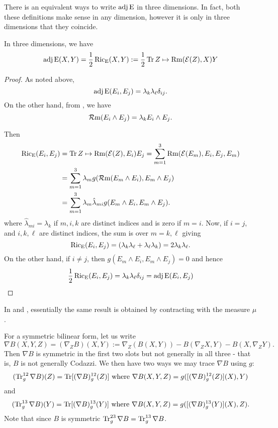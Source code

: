 \documentclass[a4paper, 12pt]{amsart}
\begin{document}
There is an equivalent ways to write \(\operatorname{adj}\operatorname{E}\) in three dimensions. In fact, both these definitions make sense in any dimension, however it is only in three dimensions that they coincide.

\begin{lemma}
\label{eq:xcf_equiv}
In three dimensions, we have
\[
\operatorname{adj}\operatorname{E}(X, Y) = \frac{1}{2} \operatorname{Ric}_{\operatorname{E}} (X, Y) := \frac{1}{2} \operatorname{Tr} Z \mapsto \operatorname{Rm}(\operatorname{\mathcal{E}}(Z), X) Y
\]
\end{lemma}

\begin{proof}
As noted above,
\[
\operatorname{adj}\operatorname{E}(E_i, E_j) = \lambda_k \lambda_{\ell} \delta_{ij}.
\]
On the other hand, from , we have
\[
\operatorname{\mathcal{R}m}(E_i \wedge E_j) = \lambda_k E_i \wedge E_j.
\]

Then
\[
\begin{split}
\operatorname{Ric}_{\operatorname{E}}(E_i, E_j) &= \operatorname{Tr} Z \mapsto \operatorname{Rm}(\operatorname{\mathcal{E}}(Z), E_i) E_j = \sum_{m=1}^3 \operatorname{Rm}(\operatorname{\mathcal{E}}(E_m), E_i, E_j, E_m) \\
&= \sum_{m=1}^3 \lambda_m g(\operatorname{\mathcal{R}m}(E_m \wedge E_i), E_m \wedge E_j) \\
&= \sum_{m=1}^3 \lambda_m \hat{\lambda}_{mi} g(E_m \wedge E_i, E_m \wedge E_j).
\end{split}
\]
where \(\hat{\lambda}_{mi} = \lambda_k\) if \(m,i,k\) are distinct indices and is zero if \(m=i\). Now, if \(i = j\), and \(i, k, \ell\) are distinct indices, the sum is over \(m=k, \ell\) giving
\[
\operatorname{Ric}_{\operatorname{E}}(E_i, E_j) = \left(\lambda_k \lambda_{\ell} + \lambda_{\ell} \lambda_k\right) = 2\lambda_k \lambda_{\ell}.
\]
On the other hand, if \(i \ne j\), then \(g(E_m \wedge E_i, E_m \wedge E_j) = 0\) and hence
\[
\frac{1}{2} \operatorname{Ric}_{\operatorname{E}}(E_i, E_j) =  \lambda_k \lambda_{\ell} \delta_{ij} = \operatorname{adj}\operatorname{E}(E_i, E_j)
\]
\end{proof}

\begin{rem}
In \cite[Lemma 3]{MR2055396} and \cite[Equation (3)]{MR2207496}, essentially the same result is obtained by contracting with the measure \(\mu\).
\end{rem}

For a symmetric bilinear form, let us write
\[
\nabla B (X, Y, Z) = (\nabla_Z B) (X, Y) := \nabla_Z (B(X, Y)) - B(\nabla_Z X, Y) - B(X, \nabla_Z Y).
\]
Then \(\nabla B\) is symmetric in the first two slots but not generally in all three - that is, \(B\) is not generally Codazzi. We then have two ways we may trace \(\nabla B\) using \(g\):
\[
(\operatorname{Tr}_g^{12} \nabla B) (Z) = \operatorname{Tr} [(\nabla B)_g^{12}(Z)] \text{ where } \nabla B(X, Y, Z) = g([(\nabla B)_g^{12}(Z)] (X), Y)
\]
and
\[
(\operatorname{Tr}_g^{13} \nabla B) (Y) = \operatorname{Tr} [(\nabla B)_g^{13}(Y)] \text{ where } \nabla B(X, Y, Z) = g([(\nabla B)_g^{13} (Y)] (X), Z).
\]
Note that since \(B\) is symmetric \(\operatorname{Tr}_g^{23} \nabla B = \operatorname{Tr}_g^{13} \nabla B\).
\end{document}
